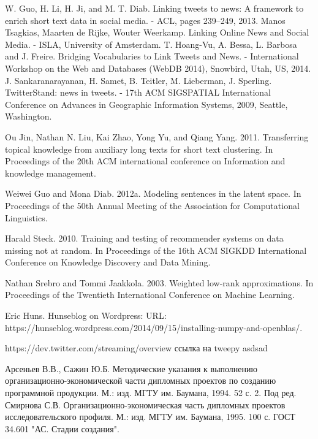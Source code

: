 
\begin{thebibliography}{0}
     W. Guo, H. Li, H. Ji, and M. T. Diab. Linking tweets to news: A framework to enrich short text data in social media. - ACL, pages 239–249, 2013.
     Manos Tsagkias, Maarten de Rijke, Wouter Weerkamp. Linking Online News and Social Media. - ISLA, University of Amsterdam.
     T. Hoang-Vu, A. Bessa, L. Barbosa and J. Freire. Bridging Vocabularies to Link Tweets and News. - International Workshop on the Web and Databases (WebDB 2014), Snowbird, Utah, US, 2014.
     J. Sankaranarayanan, H. Samet, B. Teitler, M. Lieberman, J. Sperling. TwitterStand: news in tweets. - 17th ACM SIGSPATIAL International Conference on Advances in Geographic Information Systems, 2009, Seattle, Washington.

     Ou Jin, Nathan N. Liu, Kai Zhao, Yong Yu, and Qiang Yang. 2011. Transferring topical knowledge from auxiliary long texts for short text clustering. In Proceedings of the 20th ACM international conference on Information and knowledge management.

     Weiwei Guo and Mona Diab. 2012a. Modeling sentences in the latent space. In Proceedings of the 50th Annual Meeting of the Association for Computational Linguistics.

     Harald Steck. 2010. Training and testing of recommender systems on data missing not at random. In Proceedings of the 16th ACM SIGKDD International Conference on Knowledge Discovery and Data Mining.

     Nathan Srebro and Tommi Jaakkola. 2003. Weighted low-rank approximations. In Proceedings of the Twentieth International Conference on Machine Learning.

     Eric Huns. Hunseblog on Wordpress: URL: https://hunseblog.wordpress.com/2014/09/15/installing-numpy-and-openblas/.

     https://dev.twitter.com/streaming/overview
     ссылка на tweepy
     asdsad

     Арсеньев В.В., Сажин Ю.Б. Методические указания к выполнению организационно-экономической части дипломных проектов по созданию программной продукции. М.: изд. МГТУ им. Баумана, 1994. 52 с. 2.
     Под ред. Смирнова С.В. Организационно-экономическая часть дипломных проектов исследовательского профиля. М.: изд. МГТУ им. Баумана, 1995. 100 с.
     ГОСТ 34.601 "АС. Стадии создания".

\end{thebibliography}
